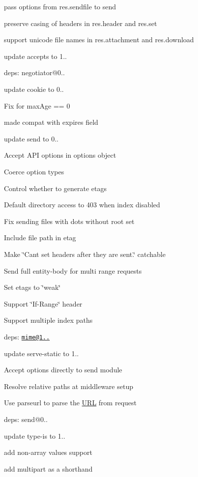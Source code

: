 \begin{DoxyItemize}
\item pass options from {\ttfamily res.\+sendfile} to {\ttfamily send}
\item preserve casing of headers in {\ttfamily res.\+header} and {\ttfamily res.\+set}
\item support unicode file names in {\ttfamily res.\+attachment} and {\ttfamily res.\+download}
\item update accepts to 1..
\begin{DoxyItemize}
\item deps\+: negotiator@0..
\end{DoxyItemize}
\item update cookie to 0..
\begin{DoxyItemize}
\item Fix for max\+Age == 0
\item made compat with expires field
\end{DoxyItemize}
\item update send to 0..
\begin{DoxyItemize}
\item Accept A\+P\+I options in options object
\item Coerce option types
\item Control whether to generate etags
\item Default directory access to 403 when index disabled
\item Fix sending files with dots without root set
\item Include file path in etag
\item Make \char`\"{}\+Can\textquotesingle{}t set headers after they are sent.\char`\"{} catchable
\item Send full entity-\/body for multi range requests
\item Set etags to \char`\"{}weak\char`\"{}
\item Support \char`\"{}\+If-\/\+Range\char`\"{} header
\item Support multiple index paths
\item deps\+: \href{mailto:mime@1.2.11}{\tt mime@1..}
\end{DoxyItemize}
\item update serve-\/static to 1..
\begin{DoxyItemize}
\item Accept options directly to {\ttfamily send} module
\item Resolve relative paths at middleware setup
\item Use parseurl to parse the \hyperlink{struct_u_r_l}{U\+R\+L} from request
\item deps\+: send@0..
\end{DoxyItemize}
\item update type-\/is to 1..
\begin{DoxyItemize}
\item add non-\/array values support
\item add {\ttfamily multipart} as a shorthand
\end{DoxyItemize}
\end{DoxyItemize}

